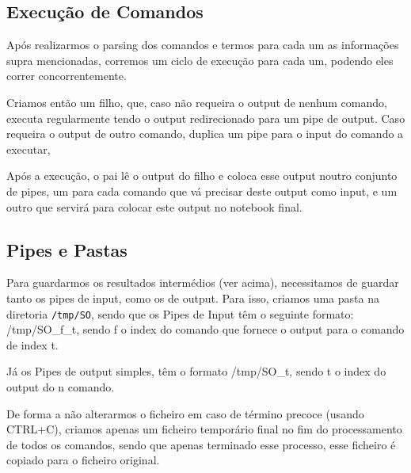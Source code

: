 \documentclass[a4paper]{article}
\begin{document}
	\subsection{Execução de Comandos}
		\tab Após realizarmos o parsing dos comandos e termos para cada um as informações
		supra mencionadas, corremos um ciclo de execução para cada um, podendo eles
		correr concorrentemente.
		\par Criamos então um filho, que, caso não requeira o output de nenhum comando,
		executa regularmente tendo o output redirecionado para um pipe de output. Caso
		requeira o output de outro comando, duplica um pipe para o input do comando a executar,
		\par Após a execução, o pai lê o output do filho e coloca esse output noutro conjunto
		de pipes, um para cada comando que vá precisar deste output como input, e um outro
		que servirá para colocar este output no notebook final.

	\subsection{Pipes e Pastas}
		\tab Para guardarmos os resultados intermédios (ver acima), necessitamos de guardar
		tanto os pipes de input, como os de output. Para isso, criamos uma pasta na diretoria
		\texttt{/tmp/SO}, sendo que os Pipes de Input têm o seguinte formato: /tmp/SO\_f\_t, sendo
		f o index do comando que fornece o output para o comando de index t.
		\par Já os Pipes de output simples, têm o formato /tmp/SO\_t, sendo t o index do output
		do n comando.
		\par De forma a não alterarmos o ficheiro em caso de término precoce (usando CTRL+C),
		criamos apenas um ficheiro temporário final no fim do processamento de todos os comandos,
		sendo que apenas terminado esse processo, esse ficheiro é copiado para o ficheiro
		original.
\end{document}
